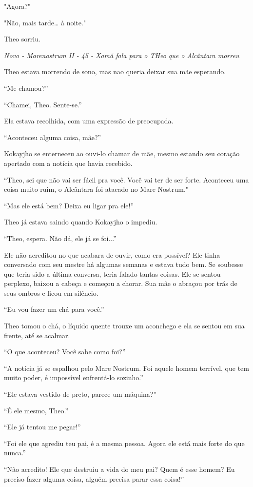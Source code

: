 "Agora?"

"Não, mais tarde\ldots{} à noite."

Theo sorriu.

\asterisc

\emph{Novo - Marenostrum II - 45 - Xamã fala para o THeo que o Alcântara
morreu}

Theo estava morrendo de sono, mas nao queria deixar sua mãe esperando.

``Me chamou?''

``Chamei, Theo. Sente-se.''

Ela estava recolhida, com uma expressão de preocupada.

``Aconteceu alguma coisa, mãe?''

Kokayjho se enterneceu ao ouvi-lo chamar de mãe, mesmo estando seu
coração apertado com a notícia que havia recebido.

``Theo, sei que não vai ser fácil pra você. Você vai ter de ser forte.
Aconteceu uma coisa muito ruim, o Alcântara foi atacado no Mare
Nostrum."

``Mas ele está bem? Deixa eu ligar pra ele!''

Theo já estava saindo quando Kokayjho o impediu.

``Theo, espera. Não dá, ele já se foi...''

Ele não acreditou no que acabara de ouvir, como era possível? Ele tinha
conversado com seu mestre há algumas semanas e estava tudo bem. Se
soubesse que teria sido a última conversa, teria falado tantas coisas.
Ele se sentou perplexo, baixou a cabeça e começou a chorar. Sua mãe o
abraçou por trás de seus ombros e ficou em silêncio.

``Eu vou fazer um chá para você.''

Theo tomou o chá, o líquido quente trouxe um aconchego e ela se sentou
em sua frente, até se acalmar.

``O que aconteceu? Você sabe como foi?''

``A notícia já se espalhou pelo Mare Nostrum. Foi aquele homem terrível,
que tem muito poder, é impossível enfrentá-lo sozinho.''

``Ele estava vestido de preto, parece um máquina?''

``É ele mesmo, Theo.''

``Ele já tentou me pegar!''

``Foi ele que agrediu teu pai, é a mesma pessoa. Agora ele está mais
forte do que nunca.''

``Não acredito! Ele que destruiu a vida do meu pai? Quem é esse homem?
Eu preciso fazer alguma coisa, alguém precisa parar essa coisa!''


